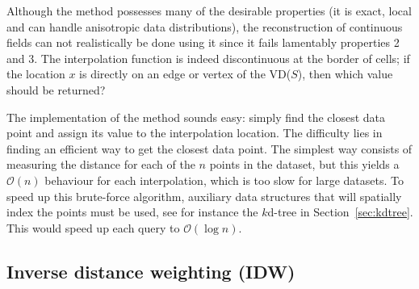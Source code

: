 Although the method possesses many of the desirable properties (it is exact, local and can handle anisotropic data distributions), the reconstruction of continuous fields can not realistically be done using it since it fails lamentably properties 2 and 3. 
The interpolation function is indeed discontinuous at the border of cells; if the location $x$ is directly on an edge or vertex of the VD($S$), then which value should be returned?

The implementation of the method sounds easy: simply find the closest data point and assign its value to the interpolation location. 
The difficulty lies in finding an efficient way to get the closest data point. 
The simplest way consists of measuring the distance for each of the $n$ points in the dataset, but this yields a $\mathcal{O}(n)$ behaviour for each interpolation, which is too slow for large datasets. 
To speed up this brute-force algorithm, auxiliary data structures that will spatially index the points must be used, see for instance the $k$d-tree in Section~\ref{sec:kdtree}.
This would speed up each query to $\mathcal{O}(\log n)$.


\subsection{Inverse distance weighting (\textbf{IDW})}

